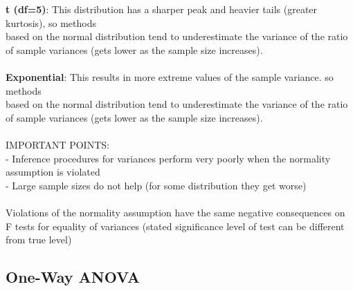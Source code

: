 \documentclass[12pt, a4paper]{article}
\begin{document}
	\textbf{t (df=5)}: This distribution has a sharper peak and heavier tails (greater kurtosis), so methods \\ \hspace*{19mm} based on the normal distribution tend to underestimate the variance of the ratio of \hspace*{19mm} sample variances (gets lower as the sample size increases). \\~\\
	\textbf{Exponential}: This results in more extreme values of the sample variance. so methods \\ \hspace*{26.5mm} based on the normal distribution tend to underestimate the variance of the \hspace*{26.5mm} ratio of sample variances (gets lower as the sample size increases). \\~\\
	IMPORTANT POINTS: \\
	- Inference procedures for variances perform very poorly when the normality assumption is \hspace*{2mm} violated \\
	- Large sample sizes do not help (for some distribution they get worse) \\~\\
	Violations of the normality assumption have the same negative consequences on F tests for equality of variances (stated significance level of test can be different from true level) \newpage
	
\begin{center} \section{One-Way ANOVA} \end{center}
\end{document}
